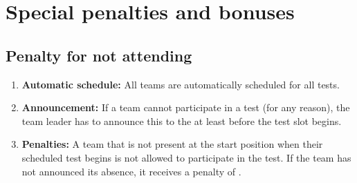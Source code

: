 \newcommand{\penaltybig}{500~}
\newcommand{\penaltysmall}{250~}

\section{Special penalties and bonuses}\label{sec:special_awards}

\subsection{Penalty for not attending}\label{rule:not_attending}
\begin{enumerate}
	\item \textbf{Automatic schedule:} All teams are automatically scheduled for all tests.

	\item \textbf{Announcement:} If a team cannot participate in a test (for any reason), the team leader has to announce this to the \OC{} at least  before the test slot begins.

	\item \textbf{Penalties:} A team that is not present at the start position when their scheduled test begins is not allowed to participate in the test.
	If the team has not announced its absence, it receives a penalty of \scoring{\penaltysmall{} points}.
\end{enumerate}

